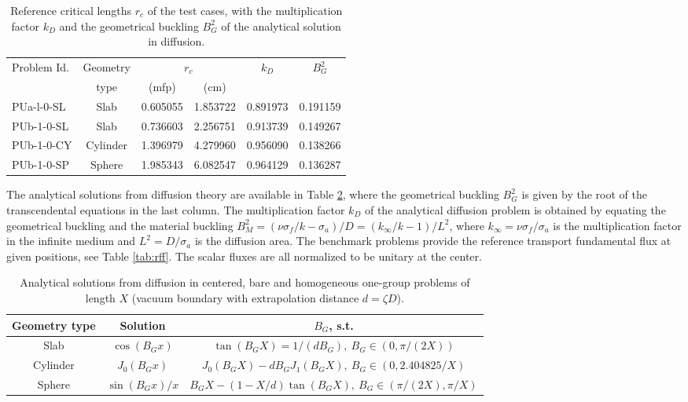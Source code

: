 \documentclass{ictt26}
\begin{document}
\begin{table}[htb]
\centering
\caption{Reference critical lengths $r_c$ of the test cases, with the multiplication factor $k_D$ and the geometrical buckling $B^2_G$ of the analytical solution in diffusion.}\label{tab:rc}
\begin{tabular}{l|c|c|c|c|c}
\multirow{2}{*}{Problem Id.} & Geometry & \multicolumn{2}{c|}{$r_c$}& \multirow{2}{*}{$k_D$} & \multirow{2}{*}{$B_G^2$}\\ \cline{3-4}
 & type & (mfp) & (cm) & & \\ \hline
PUa-l-0-SL  & Slab       & 0.605055     & 1.853722 & 0.891973 & 0.191159\\
PUb-1-0-SL  & Slab       & 0.736603   & 2.256751 & 0.913739 & 0.149267\\
PUb-1-0-CY  & Cylinder   & 1.396979     & 4.279960 & 0.956090 & 0.138266\\
PUb-1-0-SP  & Sphere     & 1.985343 & 6.082547 & 0.964129 & 0.136287\\
\end{tabular}
\end{table}

The analytical solutions from diffusion theory are available in Table \ref{tab:adsol}, where the geometrical buckling $B_G^2$ is given by the root of the transcendental equations in the last column. The multiplication factor $k_D$ of the analytical diffusion problem is obtained by equating the geometrical buckling and the material buckling $B^2_M = (\nu\sigma_f/k - \sigma_a)/D = (k_\infty/k - 1)/L^2$, where $k_\infty = \nu\sigma_f / \sigma_a$ is the multiplication factor in the infinite medium and $L^2 = D/\sigma_a$ is the diffusion area. The benchmark problems provide the reference transport fundamental flux at given positions, see Table \ref{tab:rff}. The scalar fluxes are all normalized to be unitary at the center.

\begin{table}[hbt]
\centering
\caption{Analytical solutions from diffusion in centered, bare and homogeneous one-group problems of length $X$ (vacuum boundary with extrapolation distance $d = \zeta D$).}\label{tab:adsol}
\begin{tabular}{c|c|c}
Geometry type & Solution & $B_G$, s.t.\\ \hline[1mm]
Slab & $\cos{(B_G x)}$ & $\tan{(B_G X)} = 1 / (d B_G), \: B_G \in (0, \pi /(2X))$\\[1mm]
Cylinder & $J_0 (B_G x)$ & $J_0(B_G X) - d B_G J_1(B_G X), \: B_G \in (0, 2.404825 / X)$ \\[1mm]
Sphere & $\sin{(B_G x)}/x$ & $B_G X - (1 - X / d) \tan{(B_G X)}, \: B_G \in (\pi/(2X), \pi/X)$ \\
\end{tabular}
\end{table}
\end{document}
